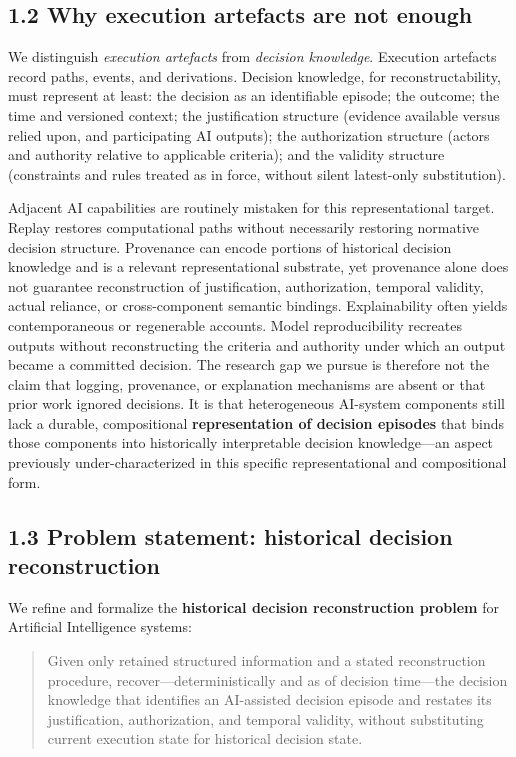 \documentclass[11pt,a4paper]{article}
\begin{document}
\subsection{1.2 Why execution artefacts are not enough}

We distinguish \emph{execution artefacts} from \emph{decision knowledge}. Execution artefacts record paths, events, and derivations. Decision knowledge, for reconstructability, must represent at least: the decision as an identifiable episode; the outcome; the time and versioned context; the justification structure (evidence available versus relied upon, and participating AI outputs); the authorization structure (actors and authority relative to applicable criteria); and the validity structure (constraints and rules treated as in force, without silent latest-only substitution).


Adjacent AI capabilities are routinely mistaken for this representational target. Replay restores computational paths without necessarily restoring normative decision structure. Provenance can encode portions of historical decision knowledge and is a relevant representational substrate, yet provenance alone does not guarantee reconstruction of justification, authorization, temporal validity, actual reliance, or cross-component semantic bindings. Explainability often yields contemporaneous or regenerable accounts. Model reproducibility recreates outputs without reconstructing the criteria and authority under which an output became a committed decision. The research gap we pursue is therefore not the claim that logging, provenance, or explanation mechanisms are absent or that prior work ignored decisions. It is that heterogeneous AI-system components still lack a durable, compositional \textbf{representation of decision episodes} that binds those components into historically interpretable decision knowledge---an aspect previously under-characterized in this specific representational and compositional form.


\subsection{1.3 Problem statement: historical decision reconstruction}

We refine and formalize the \textbf{historical decision reconstruction problem} for Artificial Intelligence systems:


\begin{quote}
Given only retained structured information and a stated reconstruction procedure, recover---deterministically and as of decision time---the decision knowledge that identifies an AI-assisted decision episode and restates its justification, authorization, and temporal validity, without substituting current execution state for historical decision state.
\end{quote}
\end{document}
